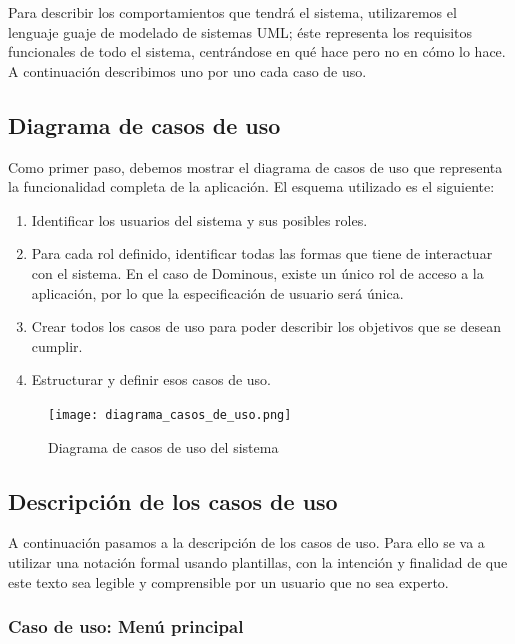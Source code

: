 Para describir los comportamientos que tendrá el sistema, utilizaremos el lenguaje guaje de modelado de sistemas UML;
éste representa los requisitos funcionales de todo el sistema, centrándose en qué hace pero no en cómo lo hace.\\

A continuación describimos uno por uno cada caso de uso.

\subsection{Diagrama de casos de uso}

Como primer paso, debemos mostrar el diagrama de casos de uso que representa la funcionalidad completa de la aplicación.
El esquema utilizado es el siguiente:
\begin{enumerate}
    \item Identificar los usuarios del sistema y sus posibles roles.
    \item Para cada rol definido, identificar todas las formas que tiene de interactuar con el sistema. En el caso
            de Dominous, existe un único rol de acceso a la aplicación, por lo que la especificación de usuario
            será única.
    \item Crear todos los casos de uso para poder describir los objetivos que se desean cumplir.
    \item Estructurar y definir esos casos de uso.
\end{enumerate}

\begin{figure}[h]
  \label{diagrama-casos-uso}
  \begin{center}
    \texttt{[image: diagrama\_casos\_de\_uso.png]}
  \end{center}
  \caption{Diagrama de casos de uso del sistema}
\end{figure}


\subsection{Descripción de los casos de uso}

A continuación pasamos a la descripción de los casos de uso. Para ello se va a utilizar una notación formal
usando plantillas, con la intención y finalidad de que este texto sea legible y comprensible por
un usuario que no sea experto.

\subsubsection{Caso de uso: Menú principal}

